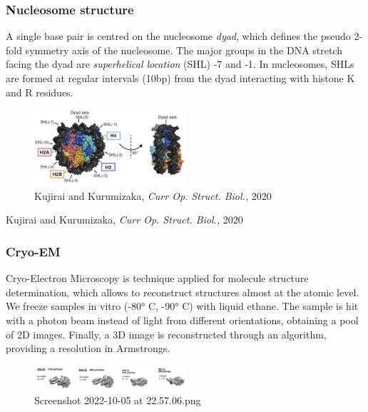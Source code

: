 \hypertarget{nucleosome-structure}{%
\subsubsection{Nucleosome structure}\label{nucleosome-structure}}

A single base pair is centred on the nucleosome \emph{dyad}, which defines the pseudo 2-fold symmetry axis of the nucleosome. The major groups in the DNA stretch facing the dyad are \emph{superhelical location} (SHL) -7 and -1. In nucleosomes, SHLs are formed at regular intervals (10bp) from the dyad interacting with histone K and R residues.

\begin{figure}
\centering
\includegraphics[width=0.5\textwidth]{../_resources/Screenshot_2022-10-05_at_22-41-07.png}
\caption{Kujirai and Kurumizaka, \emph{Curr Op. Struct. Biol.,} 2020}
\end{figure}

Kujirai and Kurumizaka, \emph{Curr Op. Struct. Biol.,} 2020

\hypertarget{cryo-em}{%
\subsubsection{Cryo-EM}\label{cryo-em}}

Cryo-Electron Microscopy is technique applied for molecule structure determination, which allows to reconstruct structures almost at the atomic level. We freeze samples in vitro (-80° C, -90° C) with liquid ethane. The sample is hit with a photon beam instead of light from different orientations, obtaining a pool of 2D images. Finally, a 3D image is reconstructed through an algorithm, providing a resolution in Armstrongs.

\begin{figure}
\centering
\includegraphics[width=0.5\textwidth]{../_resources/Screenshot_2022-10-05_at_22-57-06.png}
\caption{Screenshot 2022-10-05 at 22.57.06.png}
\end{figure}


